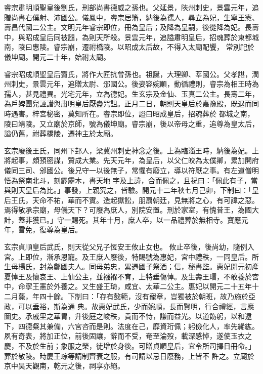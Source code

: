 \begin{pinyinscope}
 睿宗肅明順聖皇後劉氏，刑部尚書德威之孫也。父延景，陜州刺史，景雲元年，追贈尚書右僕射、沛國公。儀鳳中，睿宗居籓，納後為孺人，尋立為妃，生寧王憲、壽昌代國二公主。文明元年睿宗即位，冊為皇后；及降為皇嗣，後從降為妃。長壽中，與昭成皇后同被譴，為則天所殺。景雲元年，追謚肅明皇后，招魂葬於東都城南，陵曰惠陵。睿宗崩，遷祔橋陵。以昭成太后故，不得入太廟配饗，
 常別祀於儀坤廟。開元二十年，始祔太廟。



 睿宗昭成順聖皇后竇氏，將作大匠抗曾孫也。祖誕，大理卿、莘國公。父孝諶，潤州刺史，景雲元年，追贈太尉、邠國公。後姿容婉順，動循禮則，睿宗為相王時為孺人，甚見禮異。光宅元年，立為德妃。生玄宗及金仙、玉真二公主。長壽二年，為戶婢團兒誣譖與肅明皇后厭蠱咒詛。正月二日，朝則天皇后於嘉豫殿，既退而同時遇害。梓宮秘密，莫知所在。睿宗即位，謚曰昭成皇后，招魂葬於
 都城之南，陵曰靖陵。又立廟於京師，號為儀坤廟。睿宗崩，後以帝母之重，追尊為皇太后，謚仍舊，祔葬橋陵，遷神主於太廟。



 玄宗廢後王氏，同州下邽人，梁冀州刺史神念之後。上為臨淄王時，納後為妃。上將起事，頗預密謀，贊成大業。先天元年，為皇后，以父仁皎為太僕卿，累加開府儀同三司、邠國公。後兄守一以後無子，常懼有廢立，導以符厭之事。有左道僧明悟為祭南北斗，刻霹靂木，書天地
 字及上諱，合而佩之，且祝曰：「佩此有子，當與則天皇后為比。」事發，上親究之，皆驗。開元十二年秋七月己卯，下制曰：「皇后王氏，天命不祐，華而不實。造起獄訟，朋扇朝廷，見無將之心，有可諱之惡。焉得敬承宗廟，母儀天下？可廢為庶人，別院安置。刑於家室，有愧昔王，為國大計，蓋非獲已。」守一賜死。其年十月，庶人卒，以一品禮葬於無相寺。寶應元年，雪免，復尊為皇后。



 玄宗貞順皇后武氏，則天從父兄子恆安王攸止女也。
 攸止卒後，後尚幼，隨例入宮。上即位，漸承恩寵。及王庶人廢後，特賜號為惠妃，宮中禮秩，一同皇后。所生母楊氏，封為鄭國夫人。同母弟忠，累遷國子祭酒；信，秘書監。惠妃開元初產夏悼王及懷哀王、上仙公主，並襁褓不育，上特垂傷悼。及生壽王瑁，不敢養於宮中，命寧王憲於外養之。又生盛王琦，咸宜、太華二公主。惠妃以開元二十五年十二月薨，年四十餘。下制曰：「存有懿範，沒有寵章，豈獨被於朝班，故乃施於亞政，可以垂裕，斯為通
 典。故惠妃武氏，少而婉順，長而賢明，行合禮經，言應圖史。承戚里之華胄，升後庭之峻秩，貴而不恃，謙而益光。以道飭躬，以和逮下，四德粲其兼備，六宮咨而是則。法度在己，靡資珩佩；躬儉化人，率先絺紘。夙有奇表，將加正位，前後固讓，辭而不受，奄至淪歿，載深感悼，遂使玉衣之慶，不及於生前；象服之榮，徒增於身後。可贈貞順皇后，宜令所司擇日冊命。」葬於敬陵。時慶王琮等請制齊衰之服，有司請以忌日廢務，上皆不
 許之。立廟於京中昊天觀南，乾元之後，祠享亦絕。




\end{pinyinscope}
